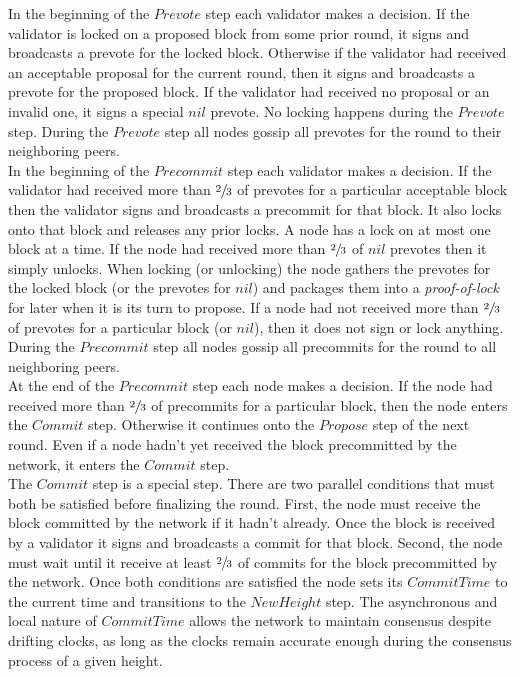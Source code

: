 \documentclass[letter,11pt]{article}
\begin{document}
In the beginning of the $Prevote$ step each validator makes a decision.  If the validator is locked on a proposed block from some prior round, it signs and broadcasts a prevote for the locked block.  Otherwise if the validator had received an acceptable proposal for the current round, then it signs and broadcasts a prevote for the proposed block.  If the validator had received no proposal or an invalid one, it signs a special $nil$ prevote.  No locking happens during the $Prevote$ step.  During the $Prevote$ step all nodes gossip all prevotes for the round to their neighboring peers.\\

In the beginning of the $Precommit$ step each validator makes a decision.  If the validator had received more than $\sfrac{2}{3}$ of prevotes for a particular acceptable block then the validator signs and broadcasts a precommit for that block.  It also locks onto that block and releases any prior locks.  A node has a lock on at most one block at a time.  If the node had received more than $\sfrac{2}{3}$ of $nil$ prevotes then it simply unlocks.  When locking (or unlocking) the node gathers the prevotes for the locked block (or the prevotes for $nil$) and packages them into a \textit{proof-of-lock} for later when it is its turn to propose.  If a node had not received more than $\sfrac{2}{3}$ of prevotes for a particular block (or $nil$), then it does not sign or lock anything.  During the $Precommit$ step all nodes gossip all precommits for the round to all neighboring peers.\\

At the end of the $Precommit$ step each node makes a decision.  If the node had received more than $\sfrac{2}{3}$ of precommits for a particular block, then the node enters the $Commit$ step.  Otherwise it continues onto the $Propose$ step of the next round.  Even if a node hadn’t yet received the block precommitted by the network, it enters the $Commit$ step.\\

The $Commit$ step is a special step.  There are two parallel conditions that must both be satisfied before finalizing the round.  First, the node must receive the block committed by the network if it hadn’t already.  Once the block is received by a validator it signs and broadcasts a commit for that block.  Second, the node must wait until it receive at least $\sfrac{2}{3}$ of commits for the block precommitted by the network.  Once both conditions are satisfied the node sets its $CommitTime$ to the current time and transitions to the $NewHeight$ step.  The asynchronous and local nature of $CommitTime$ allows the network to maintain consensus despite drifting clocks, as long as the clocks remain accurate enough during the consensus process of a given height.\\
\end{document}
